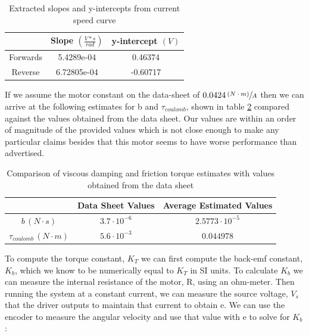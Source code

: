 \documentclass{article}
\theoremstyle{plain}
\theoremstyle{definition}
\theoremstyle{remark}
\begin{document}
\begin{table}[htb]
\begin{center}
    \begin{tabular}{|c|c|c|}
        \hline
        ~        & Slope $\left( \frac{V * s}{rad} \right) $ & y-intercept $ \left( V \right) $ \\ \hline
        Forwards & 5.4289e-04                                & 0.46374                          \\ 
        Reverse  & 6.72805e-04                               & -0.60717                         \\
        \hline
    \end{tabular}
\end{center}
\caption{Extracted slopes and y-intercepts from current speed curve}
\label{q2_b5}
\end{table}

If we assume the motor constant on the data-sheet of $0.0424 \, \sfrac{(N \cdot m)}{A}$ then we can arrive at the following estimates for b and $\tau_{coulomb}$, shown in table \ref{q2_b10} compared against the values obtained from the data sheet.  Our values are within an order of magnitude of the provided values which is not close enough to make any particular claims besides that this motor seems to have worse performance than advertised. \\

\begin{table}
\begin{center}
    \begin{tabular}{|c|c|c|}
        \hline
        ~                                                        & Data Sheet Values   & Average Estimated Values \\ \hline
        $b \, \left( N \cdot s \right) $             & $3.7 \cdot 10^{-6}$ & $2.5773 \cdot 10^{-5}$   \\ 
        $\tau_{coulomb} \, \left( N \cdot m \right)$ & $5.6 \cdot 10^{-3}$ & $0.044978$               \\
        \hline
    \end{tabular}
\end{center}
\caption{Comparison of viscous damping and friction torque estimates with values obtained from the data sheet}
\label{q2_b10}
\end{table}

To compute the torque constant, $K_{T}$ we can first compute the back-emf constant, $K_b$, which we know to be numerically equal to $K_T$ in SI units.  To calculate $K_b$ we can measure the internal resistance of the motor, R, using an ohm-meter.  Then running the system at a constant current, we can measure the source voltage, $V_{s}$ that the driver outputs to maintain that current to obtain e. We can use the encoder to measure the angular velocity and use that value with e to solve for $K_b$:
\end{document}
